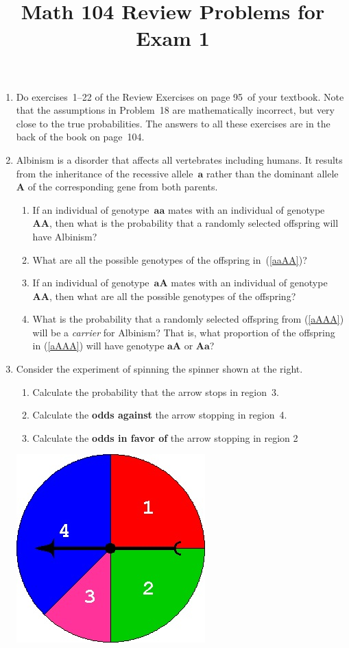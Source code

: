 \documentclass[12pt]{article}
\author{}\date{}
\title{Math 104 Review Problems for Exam 1}\author{}
\begin{document}
\maketitle
\pagestyle{empty}
\begin{enumerate}
\item Do exercises~1--22 of the Review Exercises
on page 95~of your textbook. Note that the assumptions
in Problem~18 are mathematically incorrect,
but very close to the true probabilities.
The answers to all these exercises are in the
back of the book on page~104.
\item Albinism is a disorder that affects all vertebrates
including humans. It results from the inheritance
of the recessive allele~$\mathbold{a}$ rather than the dominant
allele~$\mathbold{A}$
of the corresponding gene from both parents.
\begin{enumerate}
\item\label{aaAA} If an individual of
genotype~$\mathbold{aa}$ mates with
an individual of genotype~$\mathbold{AA}$,
then what is the probability
that a randomly selected offspring will have Albinism?
\item What are all the possible genotypes of the offspring
in~(\ref{aaAA})?
\item\label{aAAA} If an individual of
genotype~$\mathbold{aA}$ mates with
an individual of genotype~$\mathbold{AA}$, then
what are all the possible genotypes of the offspring?
\item What is the probability that a randomly selected
offspring from (\ref{aAAA})
will be a {\em carrier} for Albinism? That is,
what proportion of the offspring in  (\ref{aAAA})
will have genotype $\mathbold{aA}$ or $\mathbold{Aa}$?
\end{enumerate}

\item\label{Spinner}\begin{multicols}{2}
Consider the experiment of spinning the spinner
shown at the right.
\begin{enumerate}
\item Calculate the probability that the arrow stops
in region~3.
\item Calculate the {\bf odds against} the arrow stopping
in region~4.
\item Calculate the {\bf odds in favor of} the arrow
stopping in region 2
\end{enumerate}
\includegraphics[scale=.5]{R1Spinner}
\end{multicols}


\end{enumerate}
\end{document}
